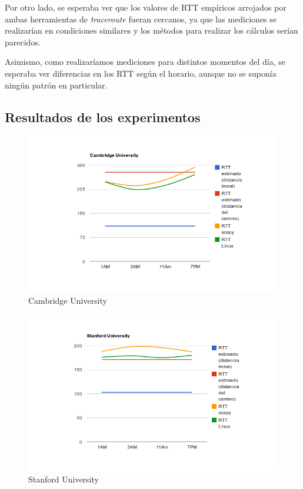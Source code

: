 Por otro lado, se esperaba ver que los valores de RTT empíricos arrojados por
ambas herramientas de \emph{traceroute} fueran cercanos, ya que las mediciones
se realizarían en condiciones similares y los métodos para realizar los
cálculos serían parecidos.

Asimismo, como realizaríamos mediciones para distintos momentos del día, se
esperaba ver diferencias en los RTT según el horario, aunque no se suponía
ningún patrón en particular.

\subsection{Resultados de los experimentos}

\begin{figure}[h!]
    \centering
    \includegraphics[width=400pt]{cambridge.png}
    \caption{Cambridge University}
    \label{fig:cambridge:count}
\end{figure}

\begin{figure}[h!]
    \centering
    \includegraphics[width=400pt]{stanford.png}
    \caption{Stanford University}
    \label{fig:stanford:count}
\end{figure}

